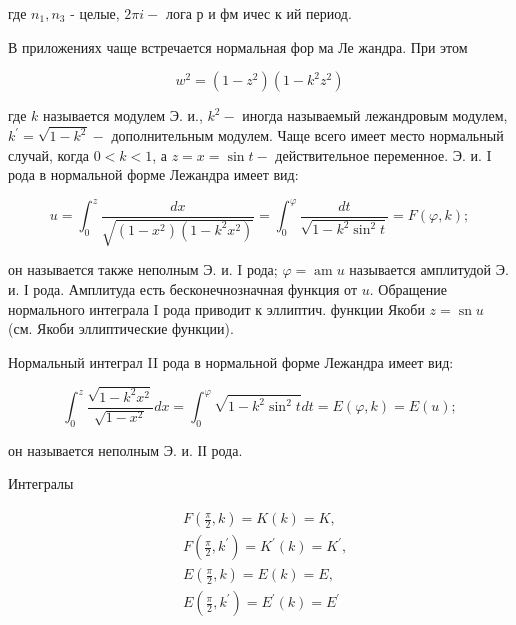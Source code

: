 \documentclass[10pt]{article}
\begin{document}
где $n_{1}, n_{3}$ - целые, $2 \pi i-$ лога р и фм ичес к ий период.



В приложениях чаще встречается нормальная фор ма Ле жандра. При этом



\[

w^{2}=\left(1-z^{2}\right)\left(1-k^{2} z^{2}\right)

\]



где $k$ называется модулем Э. и., $k^{2}-$ иногда называемый лежандровым модулем, $k^{\prime}=\sqrt{1-k^{2}}-$ дополнительным модулем. Чаще всего имеет место нормальный случай, когда $0<k<1$, а $z=x=\sin t-$ действительное переменное. Э. и. I рода в нормальной форме Лежандра имеет вид:



\[

u=\int_{0}^{z} \frac{d x}{\sqrt{\left(1-x^{2}\right)\left(1-k^{2} x^{2}\right)}}=\int_{0}^{\varphi} \frac{d t}{\sqrt{1-k^{2} \sin ^{2} t}}=F(\varphi, k) ;

\]



он называется также неполным Э. и. I рода; $\varphi=\operatorname{am} u$ называется амплитудой Э. и. І рода. Амплитуда есть бесконечнозначная функция от $u$. Обращение нормального интеграла I рода приводит к эллиптич. функции Якоби $z=\operatorname{sn} u$ (см. Якоби эллиптические функции).



Нормальный интеграл II рода в нормальной форме Лежандра имеет вид:



\[

\int_{0}^{z} \frac{\sqrt{1-k^{2} x^{2}}}{\sqrt{1-x^{2}}} d x=\int_{0}^{\varphi} \sqrt{1-k^{2} \sin ^{2} t} d t=E(\varphi, k)=E(u) ;

\]



он называется неполным Э. и. ІІ рода.



Интегралы



\[

\begin{aligned}

& F\left(\frac{\pi}{2}, k\right)=K(k)=K, \\

& F\left(\frac{\pi}{2}, k^{\prime}\right)=K^{\prime}(k)=K^{\prime}, \\

& E\left(\frac{\pi}{2}, k\right)=E(k)=E, \\

& E\left(\frac{\pi}{2}, k^{\prime}\right)=E^{\prime}(k)=E^{\prime}

\end{aligned}

\]
\end{document}
